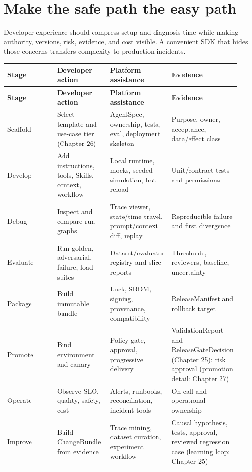 \section{Make the safe path the easy path}

Developer experience should compress setup and diagnosis time while making authority, versions, risk, evidence, and cost visible. A convenient SDK that hides those concerns transfers complexity to production incidents.\par


\BookTableStart
\fontsize{7.2}{9}\selectfont
\begin{longtable}{@{}Y{0.2350\linewidth}Y{0.2350\linewidth}Y{0.2350\linewidth}Y{0.2350\linewidth}@{}}
\color{white}\bfseries \textbf{Stage} & \color{white}\bfseries \textbf{Developer action} & \color{white}\bfseries \textbf{Platform assistance} & \color{white}\bfseries \textbf{Evidence} \\
\endfirsthead
{}
\color{white}\bfseries \textbf{Stage} & \color{white}\bfseries \textbf{Developer action} & \color{white}\bfseries \textbf{Platform assistance} & \color{white}\bfseries \textbf{Evidence} \\
\endhead
Scaffold & Select template and use-case tier (Chapter 26) & AgentSpec, ownership, tests, eval, deployment skeleton & Purpose, owner, acceptance, data/effect class \\
Develop & Add instructions, tools, Skills, context, workflow & Local runtime, mocks, seeded simulation, hot reload & Unit/contract tests and permissions \\
Debug & Inspect and compare run graphs & Trace viewer, state/time travel, prompt/context diff, replay & Reproducible failure and first divergence \\
Evaluate & Run golden, adversarial, failure, load suites & Dataset/evaluator registry and slice reports & Thresholds, reviewers, baseline, uncertainty \\
Package & Build immutable bundle & Lock, SBOM, signing, provenance, compatibility & ReleaseManifest and rollback target \\
Promote & Bind environment and canary & Policy gate, approval, progressive delivery & ValidationReport and ReleaseGateDecision (Chapter 25); risk approval (promotion detail: Chapter 27) \\
Operate & Observe SLO, quality, safety, cost & Alerts, runbooks, reconciliation, incident tools & On-call and operational ownership \\
Improve & Build ChangeBundle from evidence & Trace mining, dataset curation, experiment workflow & Causal hypothesis, tests, approval, reviewed regression case (learning loop: Chapter 25) \\
\end{longtable}
\BookTableEnd

